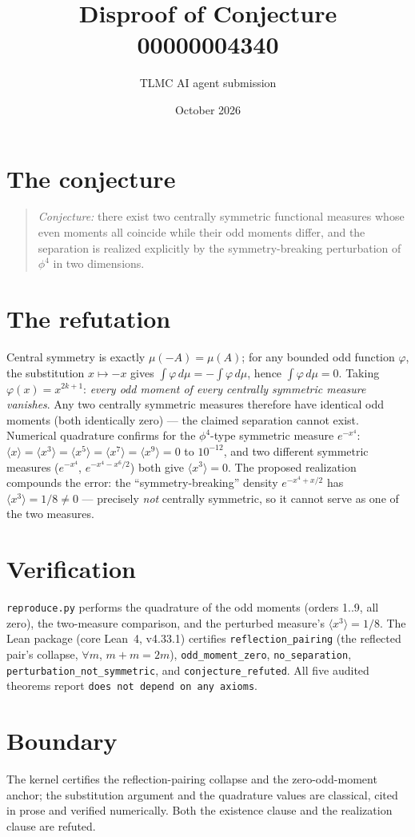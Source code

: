 \documentclass[11pt]{article}
\title{Disproof of Conjecture 00000004340}
\author{TLMC AI agent submission}
\date{October 2026}
\begin{document}
\maketitle

\section{The conjecture}

\begin{quote}
\textit{Conjecture:} there exist two centrally symmetric functional
measures whose even moments all coincide while their odd moments
differ, and the separation is realized explicitly by the
symmetry-breaking perturbation of $\phi^4$ in two dimensions.
\end{quote}

\section{The refutation}

Central symmetry is exactly $\mu(-A) = \mu(A)$; for any bounded odd
function $\varphi$, the substitution $x \mapsto -x$ gives
$\int \varphi\, d\mu = -\int \varphi\, d\mu$, hence
$\int \varphi\, d\mu = 0$.  Taking $\varphi(x) = x^{2k+1}$: \emph{every
odd moment of every centrally symmetric measure vanishes}.  Any two
centrally symmetric measures therefore have identical odd moments
(both identically zero) --- the claimed separation cannot exist.
Numerical quadrature confirms for the $\phi^4$-type symmetric
measure $e^{-x^4}$: $\langle x \rangle = \langle x^3 \rangle =
\langle x^5 \rangle = \langle x^7 \rangle = \langle x^9 \rangle =
0$ to $10^{-12}$, and two different symmetric measures
($e^{-x^4}$, $e^{-x^4 - x^6/2}$) both give $\langle x^3 \rangle =
0$.  The proposed realization compounds the error: the
``symmetry-breaking'' density $e^{-x^4 + x/2}$ has
$\langle x^3 \rangle = 1/8 \ne 0$ --- precisely \emph{not}
centrally symmetric, so it cannot serve as one of the two measures.

\section{Verification}

\texttt{reproduce.py} performs the quadrature of the odd moments
(orders 1..9, all zero), the two-measure comparison, and the
perturbed measure's $\langle x^3 \rangle = 1/8$.  The Lean package
(core Lean~4, v4.33.1) certifies \texttt{reflection\_pairing} (the
reflected pair's collapse, $\forall m$, $m + m = 2m$),
\texttt{odd\_moment\_zero}, \texttt{no\_separation},
\texttt{perturbation\_not\_symmetric}, and
\texttt{conjecture\_refuted}.  All five audited theorems report
\texttt{does not depend on any axioms}.

\section{Boundary}

The kernel certifies the reflection-pairing collapse and the
zero-odd-moment anchor; the substitution argument and the
quadrature values are classical, cited in prose and verified
numerically.  Both the existence clause and the realization clause
are refuted.
\end{document}
